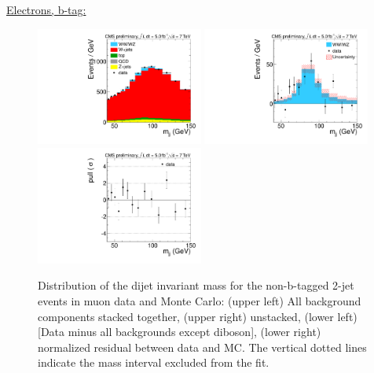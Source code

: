 \underline{Electrons, b-tag:}
{\tiny

}
\begin{figure}[h!]
  {\centering
    \includegraphics[width=0.49\textwidth]{figs/mjjfit_2jetsample/Wjj_Diboson_Muon_2jets_Stacked.pdf}
    \includegraphics[width=0.49\textwidth]{figs/mjjfit_2jetsample/Wjj_Diboson_Muon_2jets_Subtracted.pdf}
    \includegraphics[width=0.49\textwidth]{figs/mjjfit_2jetsample/Wjj_Diboson_Muon_2jets_Pull.pdf}
    \caption{Distribution of the dijet invariant mass for the non-b-tagged 2-jet events in muon data and Monte Carlo: 
      (upper left) All background components stacked together, 
      (upper right) unstacked, (lower left) [Data minus all backgrounds except diboson],  
      (lower right) normalized residual between data and MC. The vertical dotted lines
      indicate the mass interval excluded from the fit.}
    \label{fig:mjj_2jet_mu}}
\end{figure}

